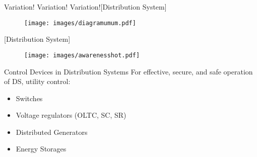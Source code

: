 \documentclass[10pt]{beamer}
\begin{document}
\begin{frame}{Variation! Variation! Variation!}[Distribution System]
\begin{figure}
	\centering
		\texttt{[image: images/diagramumum.pdf]} 
	\label{fig:umum}
\end{figure}
\end{frame}


\begin{frame}{}[Distribution System]
\begin{figure}
	\centering
		\texttt{[image: images/awarenesshot.pdf]} 
	\label{fig:aware}
\end{figure}
\end{frame}




\begin{frame}{Control Devices in Distribution Systems}
For effective, secure, and safe operation of DS, utility control:
\begin{itemize}
\item Switches
\item Voltage regulators (OLTC, SC, SR)
\item Distributed Generators
\item Energy Storages
\end{itemize}
\end{frame}
\end{document}
